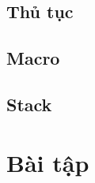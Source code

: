 \documentclass[12pt]{report}
\begin{document}
\section{Thủ tục}

\section{Macro}

\section{Stack}

\chapter{Bài tập}


% 
% 
\end{document}
